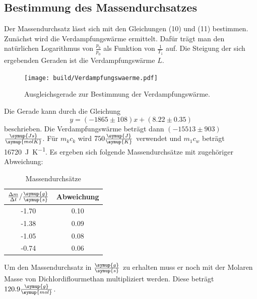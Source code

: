 \subsection{Bestimmung des Massendurchsatzes}
Der Massendurchsatz lässt sich mit den Gleichungen (10) und (11) bestimmen. Zunächst
wird die Verdampfungswärme ermittelt. Dafür trägt man den natürlichen Logarithmus von
$\frac{p_b}{p_0}$ als Funktion von $\frac{1}{T_1}$ auf. Die Steigung der sich ergebenden
Geraden ist die Verdampfungswärme $L$. \cite{sample2}
\begin{figure}[H]
  \centering
  \texttt{[image: build/Verdampfungswaerme.pdf]}
  \caption{Ausgleichsgerade zur Bestimmung der Verdampfungswärme.}
  \label{fig:Verdampfungswaerme}
\end{figure}
Die Gerade kann durch die Gleichung
\begin{equation}
  y = (-1865 \pm 108)x + (8.22 \pm 0.35)
\end{equation}
beschrieben.
Die Verdampfungswärme beträgt dann $(-15513 \pm 903)$ $\frac{\symup{Js}}{\symup{molK}}$.
Für $m_kc_k$ wird $750 \frac{\symup{J}}{\symup{K}}$ verwendet und $m_1c_w$ beträgt \SI{16720}{\joule\per\kelvin}.
Es ergeben sich folgende Massendurchsätze mit zugehöriger Abweichung:
\begin{table}
  \centering
  \caption{Massendurchsätze}
  \label{tab:Massendurchsätze}
  \begin{tabular}{c c}
    \toprule
    $\frac{\Delta m}{\Delta t}/\frac{\symup{g}}{\symup{s}}$ & Abweichung \\
    \midrule
    -1.70 & 0.10 \\
    -1.38 & 0.09 \\
    -1.05 & 0.08 \\
    -0.74 & 0.06 \\
    \bottomrule
  \end{tabular}
\end{table}
Um den Massendurchsatz in $\frac{\symup{g}}{\symup{s}}$ zu erhalten muss er noch
mit der Molaren Masse von Dichlordiflourmethan multipliziert werden.
Diese beträgt $120.9\frac{\symup{g}}{\symup{mol}}$.
